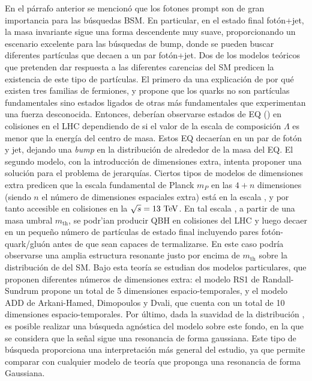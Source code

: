 En el párrafo anterior se mencionó que los fotones prompt son de gran importancia para las búsquedas \ac{BSM}. En particular, en el estado final fotón+jet, la masa invariante sigue una forma descendente muy suave, proporcionando un escenario excelente para las búsquedas de bump, donde se pueden buscar diferentes partículas que decaen a un par fotón+jet. Dos de los modelos teóricos que pretenden dar respuesta a las diferentes carencias del \ac{SM} predicen la existencia de este tipo de partículas. El primero da una explicación de por qué existen tres familias de fermiones, y propone que los quarks no son partículas fundamentales sino estados ligados de otras más fundamentales que experimentan una fuerza desconocida. Entonces, deberían observarse estados de \ac{EQ} (\qstar) en colisiones \pp en el \ac{LHC} dependiendo de si el valor de la escala de composición \(\Lambda\) es menor que la energía del centro de masa. Estos \ac{EQ} decaerían en un par de fotón y jet, dejando una \textit{bump} en la distribución de \myj alrededor de la masa del \ac{EQ}. El segundo modelo, con la introducción de dimensiones extra, intenta proponer una solución para el problema de jerarquías. Ciertos tipos de modelos de dimensiones extra predicen que la escala fundamental de Planck \(m_P\) en las \(4 + n\) dimensiones (siendo \(n\) el número de dimensiones espaciales extra) está en la escala \tev, y por tanto accesible en colisiones \pp en la \(\sqrt{s}=13~\text{TeV}\).
En tal escala \TeV, a partir de una masa umbral \(m_{\text{th}}\), se podr'ian producir \ac{QBH} en colisiones \pp del \ac{LHC} y luego decaer en un pequeño número de partículas de estado final incluyendo pares fotón-quark/gluón antes de que sean capaces de termalizarse. En este caso podría observarse una amplia estructura resonante justo por encima de \(m_{\text{th}}\) sobre la distribución de \myj del \ac{SM}. Bajo esta teoría se estudian dos modelos particulares, que proponen diferentes números de dimensiones extra: el modelo RS1 de Randall-Sundrum propone un total de 5 dimensiones espacio-temporales, y el modelo ADD de Arkani-Hamed, Dimopoulos y Dvali, que cuenta con un total de 10 dimensiones espacio-temporales.
Por último, dada la suavidad de la distribución \myj, es posible realizar una búsqueda agnóstica del modelo sobre este fondo, en la que se considera que la señal sigue una resonancia de forma gaussiana. Este tipo de búsqueda proporciona una interpretación más general del estudio, ya que permite comparar con cualquier modelo de teoría que proponga una resonancia de forma Gaussiana.


